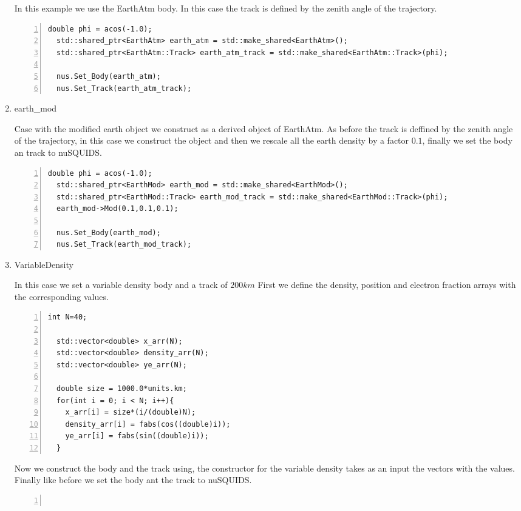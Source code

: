 \begin{enumerate}
In this example we use the {\ttf EarthAtm} body. In this case the
track is defined by the zenith angle of the trajectory.
\begin{lstlisting}[frame=leftline, numbers =
  left,breaklines=true,label = ex:sin1,firstnumber=last]
  double phi = acos(-1.0);
  std::shared_ptr<EarthAtm> earth_atm = std::make_shared<EarthAtm>();
  std::shared_ptr<EarthAtm::Track> earth_atm_track = std::make_shared<EarthAtm::Track>(phi);

  nus.Set_Body(earth_atm);
  nus.Set_Track(earth_atm_track);
\end{lstlisting}

\item {\ttf earth\_mod}

Case with the modified earth object we construct as a derived object
of EarthAtm. As before the track is deffined by the zenith angle of
the trajectory, in this case we construct the object and then we rescale
all the earth density by a factor $0.1$, finally we set the body an track to nuSQUIDS. 
\begin{lstlisting}[frame=leftline, numbers =
  left,breaklines=true,label = ex:sin1,firstnumber=last]
  double phi = acos(-1.0);
  std::shared_ptr<EarthMod> earth_mod = std::make_shared<EarthMod>();
  std::shared_ptr<EarthMod::Track> earth_mod_track = std::make_shared<EarthMod::Track>(phi);  
  earth_mod->Mod(0.1,0.1,0.1);

  nus.Set_Body(earth_mod);
  nus.Set_Track(earth_mod_track);
\end{lstlisting}


\item {\ttf VariableDensity}

In this case we set a variable density body and a track of $200km$
First we define the density, position and electron fraction arrays
with the corresponding values.
\begin{lstlisting}[frame=leftline, numbers =
  left,breaklines=true,label = ex:sin1,firstnumber=last]
  int N=40;

  std::vector<double> x_arr(N);
  std::vector<double> density_arr(N);
  std::vector<double> ye_arr(N);

  double size = 1000.0*units.km;
  for(int i = 0; i < N; i++){
    x_arr[i] = size*(i/(double)N);
    density_arr[i] = fabs(cos((double)i));
    ye_arr[i] = fabs(sin((double)i));
  }
\end{lstlisting}

Now we construct the body and the track using, the constructor for the
variable density takes as an input the vectors with the
values. Finally like before we set the body ant the track to nuSQUIDS.
\begin{lstlisting}[frame=leftline, numbers =
  left,breaklines=true,label = ex:sin1,firstnumber=last]


\end{lstlisting}
\end{enumerate}
